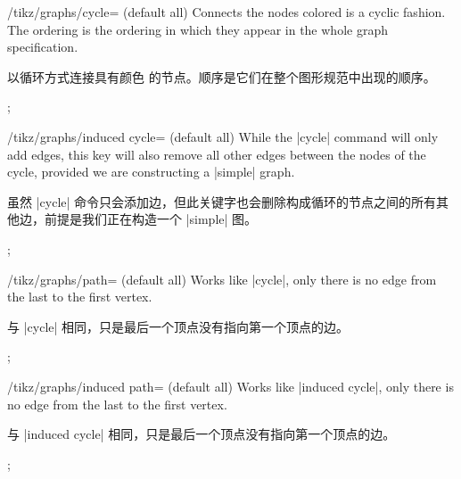 \begin{key}{/tikz/graphs/cycle= (default all)}
    Connects the nodes colored  is a cyclic fashion. The ordering
    is the ordering in which they appear in the whole graph specification.
    
    以循环方式连接具有颜色  的节点。顺序是它们在整个图形规范中出现的顺序。
\begin{codeexample}[preamble={\usetikzlibrary{graphs}}]
\tikz {};
\end{codeexample}
\end{key}

\begin{key}{/tikz/graphs/induced cycle= (default all)}
    While the |cycle| command will only add edges, this key will also remove
    all other edges between the nodes of the cycle, provided we are
    constructing a |simple| graph.
    
    虽然 |cycle| 命令只会添加边，但此关键字也会删除构成循环的节点之间的所有其他边，前提是我们正在构造一个 |simple| 图。
\begin{codeexample}[preamble={\usetikzlibrary{graphs.standard}}]
\tikz {};
\end{codeexample}
\end{key}

\begin{key}{/tikz/graphs/path= (default all)}
    Works like |cycle|, only there is no edge from the last to the first
    vertex.
    
    与 |cycle| 相同，只是最后一个顶点没有指向第一个顶点的边。
\begin{codeexample}[preamble={\usetikzlibrary{graphs}}]
\tikz {};
\end{codeexample}
\end{key}

\begin{key}{/tikz/graphs/induced path= (default all)}
    Works like |induced cycle|, only there is no edge from the last to the
    first vertex.
    
    与 |induced cycle| 相同，只是最后一个顶点没有指向第一个顶点的边。
\begin{codeexample}[preamble={\usetikzlibrary{graphs.standard}}]
\tikz {};
\end{codeexample}
\end{key}


